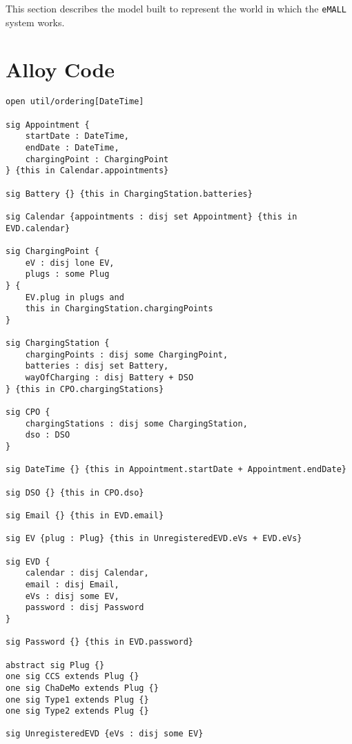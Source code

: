 This section describes the model built to represent the world in which the \verb|eMALL| system works.

\section{Alloy Code}
\label{sec: alloy}%
\begin{lstlisting}[language=alloy]
open util/ordering[DateTime]

sig Appointment {
	startDate : DateTime,
	endDate : DateTime,
	chargingPoint : ChargingPoint
} {this in Calendar.appointments}

sig Battery {} {this in ChargingStation.batteries}

sig Calendar {appointments : disj set Appointment} {this in EVD.calendar}

sig ChargingPoint {
	eV : disj lone EV,
	plugs : some Plug
} {
	EV.plug in plugs and
	this in ChargingStation.chargingPoints
}

sig ChargingStation {
	chargingPoints : disj some ChargingPoint,
	batteries : disj set Battery,
	wayOfCharging : disj Battery + DSO
} {this in CPO.chargingStations}

sig CPO {
	chargingStations : disj some ChargingStation,
	dso : DSO
}

sig DateTime {} {this in Appointment.startDate + Appointment.endDate}

sig DSO {} {this in CPO.dso}

sig Email {} {this in EVD.email}

sig EV {plug : Plug} {this in UnregisteredEVD.eVs + EVD.eVs}

sig EVD {
	calendar : disj Calendar,
	email : disj Email,
	eVs : disj some EV,
	password : disj Password
}

sig Password {} {this in EVD.password}

abstract sig Plug {}
one sig CCS extends Plug {}
one sig ChaDeMo extends Plug {}
one sig Type1 extends Plug {}
one sig Type2 extends Plug {}

sig UnregisteredEVD {eVs : disj some EV}


\end{lstlisting}

